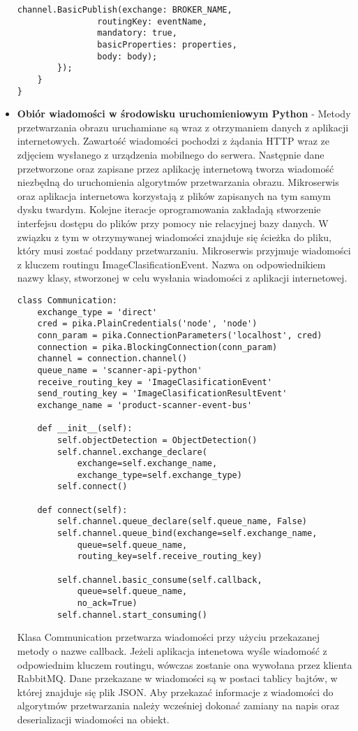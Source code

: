 \begin{itemize}
\begin{lstlisting}[caption={Metoda publikacji wiadomości.}, label={messagePublish}]
			channel.BasicPublish(exchange: BROKER_NAME,
				routingKey: eventName,
				mandatory: true,
				basicProperties: properties,
				body: body);
		});
	}
}
\end{lstlisting}
\item \textbf{Obiór wiadomości w środowisku uruchomieniowym Python} - Metody przetwarzania obrazu uruchamiane są wraz z otrzymaniem danych z aplikacji internetowych. Zawartość wiadomości pochodzi z żądania HTTP wraz ze zdjęciem wysłanego z urządzenia mobilnego do serwera. Następnie dane przetworzone oraz zapisane przez aplikację internetową tworza wiadomość niezbędną do uruchomienia algorytmów przetwarzania obrazu. Mikroserwis oraz aplikacja internetowa korzystają z plików zapisanych na tym samym dysku twardym. Kolejne iteracje oprogramowania zakładają stworzenie interfejsu dostępu do plików przy pomocy nie relacyjnej bazy danych. W związku z tym w otrzymywanej wiadomości znajduje się ścieżka do pliku, który musi zostać poddany przetwarzaniu. Mikroserwis przyjmuje wiadomości z kluczem routingu ImageClasificationEvent. Nazwa on odpowiednikiem nazwy klasy, stworzonej w celu wysłania wiadomości z aplikacji internetowej. 

\begin{lstlisting}[caption={Połączenie do kolejki RabbitMQ.}]
class Communication:
	exchange_type = 'direct'
	cred = pika.PlainCredentials('node', 'node')
	conn_param = pika.ConnectionParameters('localhost', cred)
	connection = pika.BlockingConnection(conn_param)
	channel = connection.channel()
	queue_name = 'scanner-api-python'
	receive_routing_key = 'ImageClasificationEvent'
	send_routing_key = 'ImageClasificationResultEvent'
	exchange_name = 'product-scanner-event-bus'
	
	def __init__(self):
		self.objectDetection = ObjectDetection()
		self.channel.exchange_declare(
			exchange=self.exchange_name,
			exchange_type=self.exchange_type)
		self.connect()
	
	def connect(self):
		self.channel.queue_declare(self.queue_name, False)
		self.channel.queue_bind(exchange=self.exchange_name,
			queue=self.queue_name,
			routing_key=self.receive_routing_key)
		
		self.channel.basic_consume(self.callback,
			queue=self.queue_name,
			no_ack=True)
		self.channel.start_consuming()
\end{lstlisting}

Klasa Communication przetwarza wiadomości przy użyciu przekazanej metody o nazwe callback. Jeżeli aplikacja intenetowa wyśle wiadomość z odpowiednim kluczem routingu, wówczas zostanie ona wywołana przez klienta RabbitMQ. Dane przekazane w wiadomości są w postaci tablicy bajtów, w której znajduje się plik JSON. Aby przekazać informacje z wiadomości do algorytmów przetwarzania należy wcześniej dokonać zamiany na napis oraz deserializacji wiadomości na obiekt.




\end{itemize}
